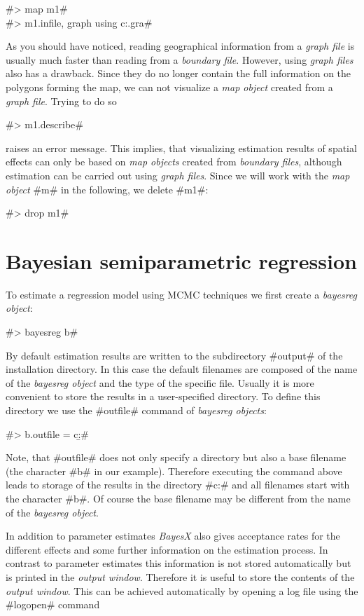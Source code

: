 \documentclass[11pt,a4paper,twoside]{bayesxreport}
\begin{document}
#> map m1#\\
#> m1.infile, graph using c:\data\zambiasort.gra#

As you should have noticed, reading geographical information from a
{\it graph file} is usually much faster than reading from a {\it
boundary file}. However, using {\it graph files} also has a
drawback. Since they do no longer contain the full information on
the polygons forming the map, we can not visualize a {\it map
object} created from a {\it graph file}. Trying to do so

#> m1.describe#

raises an error message. This implies, that visualizing estimation
results of spatial effects can only be based on {\it map objects}
created from {\it boundary files}, although estimation can be
carried out using {\it graph files}. Since we will work with the
{\it map object} #m# in the following, we delete #m1#:

#> drop m1#

\section{Bayesian semiparametric
regression}\label{zambia_mcmc_regression}

To estimate a regression model using MCMC techniques we first create
a {\it bayesreg object}:

#> bayesreg b#

By default estimation results are written to the subdirectory
#output# of the installation directory. In this case the default
filenames are composed of the name of the {\it bayesreg object} and
the type of the specific file. Usually it is more convenient to
store the results in a user-specified directory. To define this
directory we use the #outfile# command of {\it bayesreg objects}:

#> b.outfile = c:\data\b#

Note, that #outfile# does not only specify a directory but also a
base filename (the character #b# in our example). Therefore
executing the command above leads to storage of the results in the
directory #c:\data# and all filenames start with the character #b#.
Of course the base filename may be different from the name of the
{\it bayesreg object}.

In addition to parameter estimates {\it BayesX} also gives
acceptance rates for the different effects and some further
information on the estimation process. In contrast to parameter
estimates this information is not stored automatically but is
printed in the {\it output window}. Therefore it is useful to store
the contents of the {\it output window}. This can be achieved
automatically by opening a log file using the #logopen# command
\end{document}
